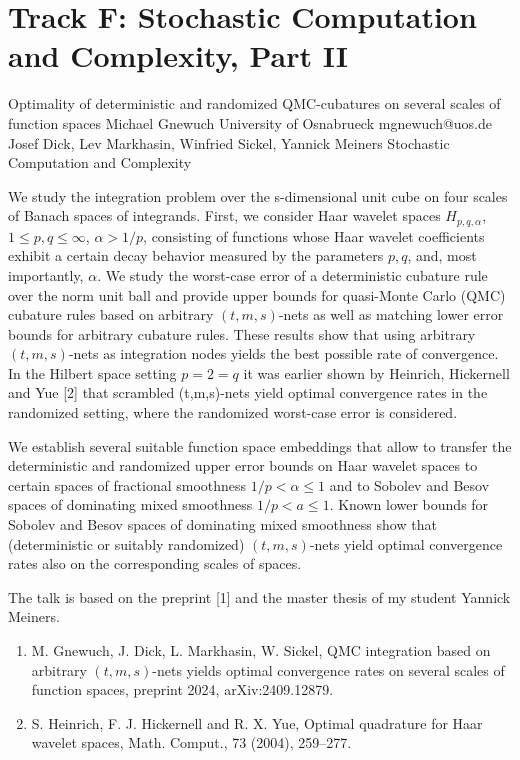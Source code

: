 \section{Track F: Stochastic Computation and Complexity, Part II}\newpage

\begin{talk}
  {Optimality of deterministic and randomized QMC-cubatures on several scales of function spaces}%
  {Michael Gnewuch}%
  {University of Osnabrueck}%
  {mgnewuch@uos.de}%
  {Josef Dick, Lev Markhasin, Winfried Sickel, Yannick Meiners}%
  {Stochastic Computation and Complexity}%
    
   
   
We study the integration problem over the s-dimensional unit cube on four scales of Banach spaces of integrands. First, we consider Haar wavelet spaces $H_{p, q, \alpha}$, $1\le p, q \le \infty$, $\alpha > 1/p$, consisting of functions whose Haar wavelet coefficients exhibit a certain decay behavior measured by the parameters $p,q$, and, most importantly, $\alpha$.  We study the worst-case error of a deterministic cubature rule over the norm unit ball 
and provide upper bounds for quasi-Monte Carlo (QMC) cubature rules based on arbitrary $(t,m,s)$-nets as well as matching lower error bounds for arbitrary cubature rules. These results show that using arbitrary $(t,m,s)$-nets as integration nodes yields the best possible rate of convergence. In the Hilbert space setting $p=2 = q$ it was earlier shown by Heinrich, Hickernell and Yue [2]  that scrambled (t,m,s)-nets yield optimal convergence rates in the randomized setting, where the randomized worst-case error is considered. 

We establish several suitable function space embeddings that allow to transfer the deterministic and randomized upper error bounds on Haar wavelet spaces
to certain spaces of fractional smoothness $1/p < \alpha  \le 1$ and to Sobolev and Besov spaces of dominating mixed smoothness $1/p < a \le 1$.
Known lower bounds for Sobolev and Besov spaces of dominating mixed smoothness show that (deterministic or suitably randomized) $(t,m,s)$-nets yield optimal convergence rates also on the corresponding scales of spaces.   

The talk is based on the preprint [1] and the master thesis of my student Yannick Meiners.
\medskip

\begin{enumerate}
 \item[{[1]}] M. Gnewuch, J. Dick, L. Markhasin, W. Sickel, QMC integration based on arbitrary $(t,m,s)$-nets yields optimal convergence rates on several scales of function spaces, preprint 2024, arXiv:2409.12879. 
        \item[{[2]}] S. Heinrich, F. J. Hickernell and R. X. Yue, Optimal quadrature for Haar wavelet spaces, Math. Comput., 73 (2004), 259--277.
 \end{enumerate}
\end{talk}

